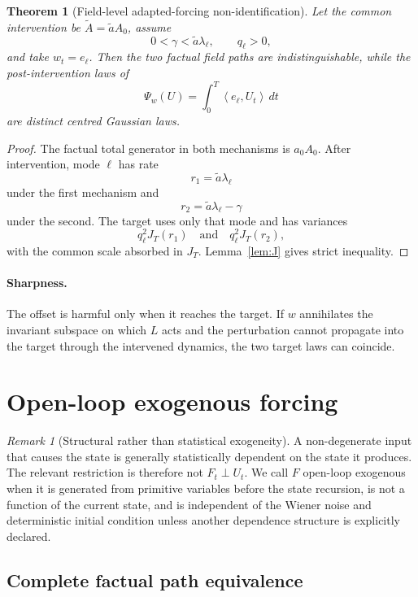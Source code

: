 \documentclass[11pt]{article}
\newtheorem{theorem}[assumption]{Theorem}
\theoremstyle{remark}
\newtheorem{remark}[assumption]{Remark}
\newcommand{\inner}[2]{\left\langle #1,#2\right\rangle}
\begin{document}
\begin{theorem}[Field-level adapted-forcing non-identification]\label{thm:field}
Let the common intervention be $\widetilde A=\widetilde aA_0$, assume
\[
 0<\gamma<\widetilde a\lambda_\ell,
 \qquad
 q_\ell>0,
\]
and take $w_t=e_\ell$. Then the two factual field paths are indistinguishable, while the post-intervention laws of
\[
 \Psi_w(U)=\int_0^T\inner{e_\ell}{U_t}\,dt
\]
are distinct centred Gaussian laws.
\end{theorem}

\begin{proof}
The factual total generator in both mechanisms is $a_0A_0$. After intervention, mode $\ell$ has rate
\[
 r_1=\widetilde a\lambda_\ell
\]
under the first mechanism and
\[
 r_2=\widetilde a\lambda_\ell-\gamma
\]
under the second. The target uses only that mode and has variances
\[
 q_\ell^2J_T(r_1)
 \quad\text{and}\quad
 q_\ell^2J_T(r_2),
\]
with the common scale absorbed in $J_T$. Lemma~\ref{lem:J} gives strict inequality.
\end{proof}

\paragraph{Sharpness.}
The offset is harmful only when it reaches the target. If $w$ annihilates the invariant subspace on which $L$ acts and the perturbation cannot propagate into the target through the intervened dynamics, the two target laws can coincide.

\section{Open-loop exogenous forcing}

\begin{remark}[Structural rather than statistical exogeneity]\label{rem:exog}
A non-degenerate input that causes the state is generally statistically dependent on the state it produces. The relevant restriction is therefore not $F_t\perp U_t$. We call $F$ open-loop exogenous when it is generated from primitive variables before the state recursion, is not a function of the current state, and is independent of the Wiener noise and deterministic initial condition unless another dependence structure is explicitly declared.
\end{remark}

\subsection{Complete factual path equivalence}
\end{document}
